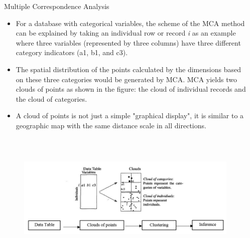 \documentclass[final]{beamer}
\newlength{\sepwid}
\newlength{\onecolwid}
\newlength{\twocolwid}
\begin{document}
\begin{frame}[t]
\begin{columns}[t]
    \begin{column}{\sepwid}\end{column}			%
    \begin{column}{\twocolwid}							%
      \begin{columns}[t,totalwidth=\twocolwid]	%
        \begin{column}{\onecolwid}\vspace{-.69in}
          \begin{block}{Multiple Correspondence Analysis}
            \small{}
            \begin{itemize}
              \item For a database with categorical variables, the scheme of the MCA method can be explained by taking an individual row or record \textit{i} as an example where three variables (represented by three columns) have three different category indicators (a1, b1, and c3).
              \item The spatial distribution of the points calculated by the dimensions based on these three categories would be generated by MCA. MCA yields two clouds of points as shown in the figure: the cloud of individual records and the cloud of categories.
              \item A cloud of points is not just a simple "graphical display", it is similar to a geographic map with the same distance scale in all directions.
            \end{itemize}
            \vspace{0.25in}
            \begin{figure}
              \begin{center}
                \includegraphics[width=9in, height=2.5in]{A1.png}

\end{center}
\end{figure}
\end{block}
\end{column}
\end{columns}
\end{column}
\end{columns}
\end{frame}
\end{document}
